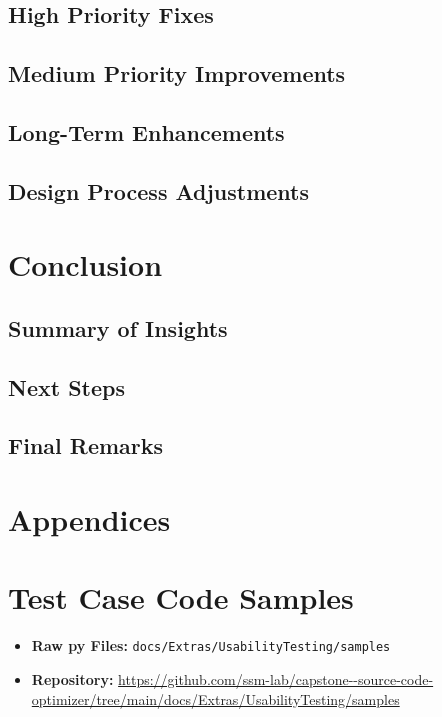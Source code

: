 \documentclass{article}
\begin{document}
\subsection{High Priority Fixes}
\subsection{Medium Priority Improvements}
\subsection{Long-Term Enhancements}
\subsection{Design Process Adjustments}

\newpage
\section{Conclusion}
\subsection{Summary of Insights}
\subsection{Next Steps}
\subsection{Final Remarks}

\newpage
\section*{Appendices}

\section{Test Case Code Samples}
\label{app:code}


\begin{itemize}
    \item \textbf{Raw py Files:} \texttt{docs/Extras/UsabilityTesting/samples}
    \item \textbf{Repository:} \url{https://github.com/ssm-lab/capstone--source-code-optimizer/tree/main/docs/Extras/UsabilityTesting/samples}
\end{itemize}
\end{document}
